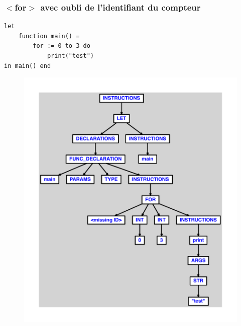 \documentclass{article}
\begin{document}
\subsubsection{$ < $for$ > $ avec oubli de l'identifiant du compteur}
\begin{lstlisting}
let
	function main() =
		for := 0 to 3 do
			print("test")
in main() end
\end{lstlisting}
\newpage
\begin{figure}[H]
\centering
\includegraphics[max width=\textwidth]{ast/ast_194.pdf}
\end{figure}
\newpage
\end{document}
